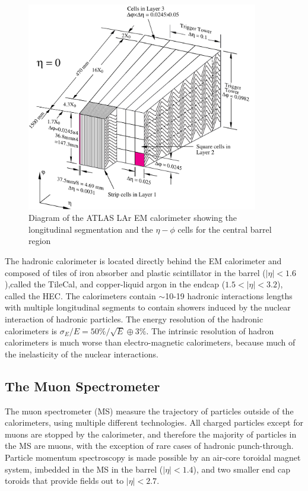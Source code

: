 \begin{figure}[!t]
\centering 
\includegraphics[width=0.9\textwidth]{figs/lhc/LARG3-TDR-barrelM-eps-converted-to}
\caption{Diagram of the ATLAS  LAr EM calorimeter showing the longitudinal segmentation and the $\eta-\phi$ cells for the central barrel region}
\label{figure:lhc_calo_em}
\end{figure}




The hadronic calorimeter is located directly behind the EM calorimeter and composed of tiles of iron absorber and plastic scintillator  in the barrel ($|\eta| < 1.6$),called the TileCal,  and copper-liquid argon in the endcap ($1.5<|\eta| <3.2$), called the HEC. The calorimeters contain $\sim$10-19 hadronic interactions lengths with multiple longitudinal segments to contain showers induced by the nuclear interaction of hadronic particles. The energy resolution of the hadronic calorimeters is $\sigma_E/E = 50\%/\sqrt{E}\oplus3\%$. The intrinsic resolution of hadron calorimeters is much worse than electro-magnetic calorimeters, because much of the inelasticity of the nuclear interactions. 

\subsection{The Muon Spectrometer} 

The muon spectrometer (MS) measure the trajectory of particles outside of the calorimeters, using multiple different technologies. All charged particles except for muons are stopped by the calorimeter, and therefore the majority of particles in the MS are muons, with the exception of rare cases of hadronic punch-through. Particle momentum spectroscopy is made possible by an air-core toroidal magnet system, imbedded in the MS in the barrel ($|\eta| < 1.4$), and two smaller end cap toroids that provide fields out to $|\eta| < 2.7$. 

